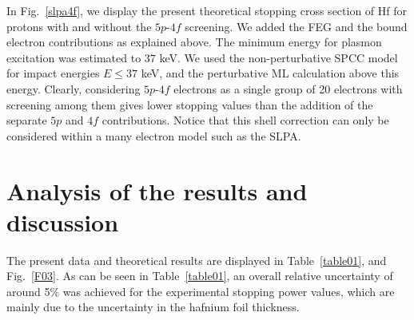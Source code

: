 \documentclass[aps,pra,reprint,groupedaddress]{revtex4-1}
\begin{document}
In Fig.~\ref{slpa4f}, we display the present theoretical stopping cross section of Hf for protons with and without the $5p$-$4f$ screening. We added the FEG and the bound electron contributions as explained above. The minimum energy for plasmon excitation was estimated to $37$ keV. We used the non-perturbative SPCC model for impact energies $E \leq 37$ keV, and the perturbative ML calculation above this energy. %
Clearly, considering $5p$-$4f$ electrons as a single group of 20 electrons with screening among them gives lower stopping values than the addition of the separate $5p$ and $4f$ contributions. Notice that this shell correction can only be considered within a many electron model such as the SLPA.

\section{Analysis of the results and discussion}
\label{discussion}

The present data and theoretical results are displayed in Table~\ref{table01}, and Fig.~\ref{F03}. As can be seen in Table~\ref{table01}, an overall relative uncertainty of around 5\% was achieved for the experimental stopping power values, which are mainly due to the uncertainty in the hafnium foil thickness. 
\end{document}
